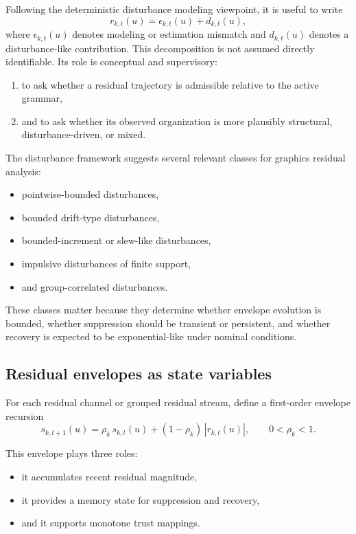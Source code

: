 \documentclass[11pt,letterpaper]{article}
\theoremstyle{gcresult}
\theoremstyle{definition}
\begin{document}
Following the deterministic disturbance modeling viewpoint, it is useful to write
\begin{equation}
r_{k,t}(u)=\epsilon_{k,t}(u)+d_{k,t}(u),
\end{equation}
where $\epsilon_{k,t}(u)$ denotes modeling or estimation mismatch and $d_{k,t}(u)$ denotes a disturbance-like contribution. This decomposition is not assumed directly identifiable. Its role is conceptual and supervisory:
\begin{enumerate}[leftmargin=1.5em]
    \item to ask whether a residual trajectory is admissible relative to the active grammar,
    \item and to ask whether its observed organization is more plausibly structural, disturbance-driven, or mixed.
\end{enumerate}

The disturbance framework suggests several relevant classes for graphics residual analysis:
\begin{itemize}[leftmargin=1.5em]
    \item pointwise-bounded disturbances,
    \item bounded drift-type disturbances,
    \item bounded-increment or slew-like disturbances,
    \item impulsive disturbances of finite support,
    \item and group-correlated disturbances.
\end{itemize}

These classes matter because they determine whether envelope evolution is bounded, whether suppression should be transient or persistent, and whether recovery is expected to be exponential-like under nominal conditions. 


\subsection{Residual envelopes as state variables}

For each residual channel or grouped residual stream, define a first-order envelope recursion
\begin{equation}
s_{k,t+1}(u)=\rho_k\,s_{k,t}(u)+(1-\rho_k)\,|r_{k,t}(u)|,
\qquad 0<\rho_k<1.
\end{equation}

This envelope plays three roles:
\begin{itemize}[leftmargin=1.5em]
    \item it accumulates recent residual magnitude,
    \item it provides a memory state for suppression and recovery,
    \item and it supports monotone trust mappings.
\end{itemize}
\end{document}
